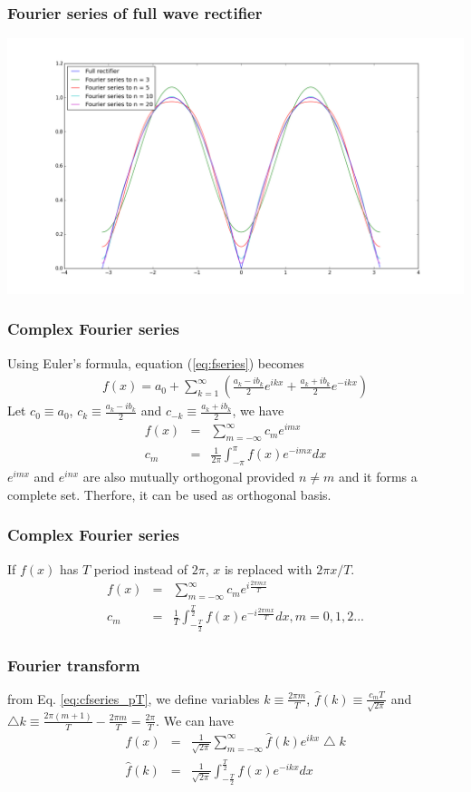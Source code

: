 \documentclass{beamer}
\begin{document}
\begin{frame}
\frametitle{Fourier series of full wave rectifier}
\includegraphics[scale=0.3]{fullrectifier.png}
\end{frame}
\begin{frame}
\frametitle{Complex Fourier series}
Using Euler's formula, equation (\ref{eq:fseries}) becomes 
\begin{eqnarray}
f(x)=a_0 + \sum_{k=1}^{\infty} \left(\frac{a_k - ib_k}{2} e^{ikx} + \frac{a_k + ib_k}{2}e^{-ikx}\right) \nonumber
\end{eqnarray}
Let $c_0 \equiv a_0$, $c_k \equiv \frac{a_k - ib_k}{2}$ and $c_{-k} \equiv \frac{a_k + ib_k}{2}$, we have
\begin{eqnarray}
f(x)&=&\sum_{m=-\infty}^{\infty} c_m e^{imx} \nonumber \\
c_m&=&\frac{1}{2\pi}\int_{-\pi}^{\pi} f(x) e^{-imx} dx
\label{eq:cfseries}
\end{eqnarray}
$e^{imx}$ and $e^{inx}$ are also mutually orthogonal provided $n \neq m$ and it forms a complete set. Therfore, it can be used as orthogonal basis.\newline
\end{frame}
\begin{frame}
\frametitle{Complex Fourier series}
If $f(x)$ has $T$ period instead of $2\pi$, $x$ is replaced with $2\pi x /T$.
\begin{eqnarray}
f(x)&=&\sum_{m=-\infty}^{\infty} c_m e^{i\frac{2\pi mx}{T}} \nonumber \\
c_m&=&\frac{1}{T}\int_{-\frac{T}{2}}^{\frac{T}{2}} f(x) e^{-i\frac{2\pi mx}{T}} dx, m = 0,1,2...
\label{eq:cfseries_pT}
\end{eqnarray}
\end{frame}
\begin{frame}
\frametitle{Fourier transform}
from Eq. \ref{eq:cfseries_pT}, we define variables $k \equiv \frac{2\pi m}{T}$, $\hat{f}(k) \equiv\frac{c_mT}{\sqrt{2\pi}}$ and $ \bigtriangleup{k} \equiv \frac{2\pi (m+1)}{T} - \frac{2\pi m}{T} = \frac{2\pi}{T}$. \newline We can have
\begin{eqnarray}
f(x)&=&\frac{1}{\sqrt{2\pi}}\sum_{m=-\infty}^{\infty} \hat{f}(k) e^{ikx} \bigtriangleup{k} \nonumber \\
\hat{f}(k)&=&\frac{1}{\sqrt{2\pi}}\int_{-\frac{T}{2}}^{\frac{T}{2}} f(x) e^{-ikx}dx\nonumber
\end{eqnarray}
\end{frame}
\end{document}
